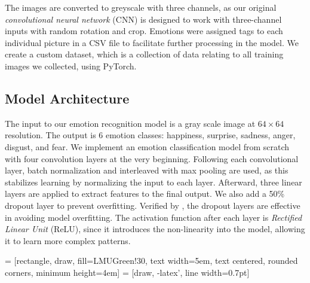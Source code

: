 The images are converted to greyscale with three channels, 
as our original \textit{convolutional neural network} (CNN) is designed to work with three-channel inputs with random rotation and crop. 
Emotions were assigned tags to each individual picture in a CSV file to facilitate further processing in the model.
We create a custom dataset, which is a collection of data relating to all training images we collected, 
using PyTorch.

\subsection{Model Architecture}
The input to our emotion recognition model is a gray scale image at $64 \times 64 $ resolution. 
The output is 6 emotion classes: happiness, surprise, sadness, anger, disgust, and fear. 
We implement an emotion classification model from scratch with four convolution layers at the very beginning. 
Following each convolutional layer, 
batch normalization and interleaved with max pooling are used, 
as this stabilizes learning by normalizing the input to each layer. 
Afterward, three linear layers are applied to extract features to the final output. 
We also add a 50\% dropout layer to prevent overfitting. 
Verified by \citet{BarsoumZCZ16}, 
the dropout layers are effective in avoiding model overfitting. 
The activation function after each layer is \textit{Rectified Linear Unit} (ReLU), 
since it introduces the non-linearity into the model, 
allowing it to learn more complex patterns. 

 = [rectangle, draw, fill=LMUGreen!30, text width=5em, text centered, rounded corners, minimum height=4em]
 = [draw, -latex', line width=0.7pt]

